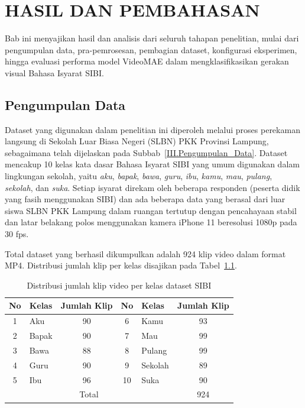 ﻿\newpage
\chapter{HASIL DAN PEMBAHASAN} \label{BabIV}

Bab ini menyajikan hasil dan analisis dari seluruh tahapan penelitian, mulai dari pengumpulan data, pra-pemrosesan, pembagian dataset, konfigurasi eksperimen, hingga evaluasi performa model VideoMAE dalam mengklasifikasikan gerakan visual Bahasa Isyarat SIBI.\par

\section{Pengumpulan Data} \label{IV.Pengumpulan}

Dataset yang digunakan dalam penelitian ini diperoleh melalui proses perekaman langsung di Sekolah Luar Biasa Negeri (SLBN) PKK Provinsi Lampung, sebagaimana telah dijelaskan pada Subbab~\ref{III.Pengumpulan_Data}. Dataset mencakup 10 kelas kata dasar Bahasa Isyarat SIBI yang umum digunakan dalam lingkungan sekolah, yaitu \textit{aku}, \textit{bapak}, \textit{bawa}, \textit{guru}, \textit{ibu}, \textit{kamu}, \textit{mau}, \textit{pulang}, \textit{sekolah}, dan \textit{suka}. Setiap isyarat direkam oleh beberapa responden (peserta didik yang fasih menggunakan SIBI) dan ada beberapa data yang berasal dari luar siswa SLBN PKK Lampung dalam ruangan tertutup dengan pencahayaan stabil dan latar belakang polos menggunakan kamera iPhone 11 beresolusi 1080p pada 30 fps.\par

Total dataset yang berhasil dikumpulkan adalah 924 klip video dalam format MP4. Distribusi jumlah klip per kelas disajikan pada Tabel~\ref{tab:4.distribusi_kelas}.\par

\begin{table}[H]
\centering
\caption{Distribusi jumlah klip video per kelas dataset SIBI}
\label{tab:4.distribusi_kelas}
{\setlength{\tabcolsep}{3pt}
\footnotesize
\begin{tabular}{|c|l|c||c|l|c|}
\hline
No & Kelas & Jumlah Klip & No & Kelas & Jumlah Klip \\
\hline
1  & Aku     & 90  & 6  & Kamu    & 93 \\
\hline
2  & Bapak   & 90  & 7  & Mau     & 99 \\
\hline
3  & Bawa    & 88  & 8  & Pulang  & 99 \\
\hline
4  & Guru    & 90  & 9  & Sekolah & 89 \\
\hline
5  & Ibu     & 96  & 10 & Suka    & 90 \\
\hline
\multicolumn{5}{|c|}{Total} & 924 \\
\hline
\end{tabular}
}
\end{table}

